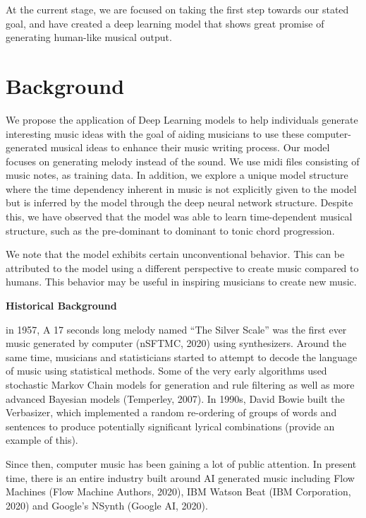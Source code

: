 \documentclass[12pt,oneside]{chicagocapstone}
\begin{document}
At the current stage, we are focused on taking the first step towards our stated goal, and have created a deep learning model that shows great promise of generating human-like musical output.

\hypertarget{background}{%
\chapter*{Background}\label{background}}

We propose the application of Deep Learning models to help individuals generate interesting music ideas with the goal of aiding musicians to use these computer-generated musical ideas to enhance their music writing process. Our model focuses on generating melody instead of the sound. We use midi files consisting of music notes, as training data. In addition, we explore a unique model structure where the time dependency inherent in music is not explicitly given to the model but is inferred by the model through the deep neural network structure. Despite this, we have observed that the model was able to learn time-dependent musical structure, such as the pre-dominant to dominant to tonic chord progression.

We note that the model exhibits certain unconventional behavior. This can be attributed to the model using a different perspective to create music compared to humans. This behavior may be useful in inspiring musicians to create new music.

\textbf{Historical Background}

in 1957, A 17 seconds long melody named ``The Silver Scale'' was the first ever music generated by computer (nSFTMC, 2020) using synthesizers. Around the same time, musicians and statisticians started to attempt to decode the language of music using statistical methods. Some of the very early algorithms used stochastic Markov Chain models for generation and rule filtering as well as more advanced Bayesian models (Temperley, 2007). In 1990s, David Bowie built the Verbasizer, which implemented a random re-ordering of groups of words and sentences to produce potentially significant lyrical combinations (provide an example of this).

Since then, computer music has been gaining a lot of public attention. In present time, there is an entire industry built around AI generated music including Flow Machines (Flow Machine Authors, 2020), IBM Watson Beat (IBM Corporation, 2020) and Google's NSynth (Google AI, 2020).
\end{document}
